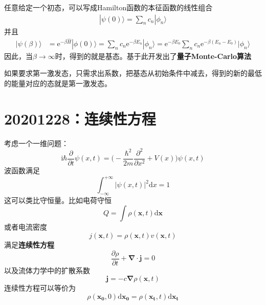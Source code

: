\documentclass[12pt]{article}
\begin{document}
    任意给定一个初态，可以写成Hamilton函数的本征函数的线性组合
    \begin{align*}
        |\psi(0) \rangle = \sum_n c_n |\phi_n\rangle
    \end{align*}
    并且
    \begin{align*}
        |\psi(\beta) \rangle &= \mathrm{e}^{-\beta \hat{H}} |\phi(0) \rangle = \sum_n c_n\mathrm{e}^{-\beta E_n}|\phi_n \rangle = \mathrm{e}^{-\beta E_0} \sum_n c_n \mathrm{e}^{-\beta(E_n-E_0)} |\phi_n \rangle
    \end{align*}
    因此，当$\beta \to \infty$时，得到的就是基态。基于此开发出了\textbf{量子Monte-Carlo算法}

    如果要求第一激发态，只需求出系数，把基态从初始条件中减去，得到的新的最低的能量对应的态就是第一激发态。

\section{20201228：连续性方程}

    考虑一个一维问题：
    \begin{equation*}
        \mathrm{i}\hbar \frac {\partial}{\partial t} \psi(x,t) = \bigg(-\frac {\hbar^2}{2m} \frac {\partial ^2}{\partial x^2} + V(x)\bigg)\psi(x,t)
    \end{equation*}
    波函数满足
    \begin{equation*}
        \int_{-\infty}^{+\infty} |\psi(x,t)|^2 \mathrm{d}x = 1
    \end{equation*}
    这可以类比守恒量。比如电荷守恒
    \begin{equation*}
        Q = \int \rho(\bm{x},t) \mathrm{d}\bm{x}
    \end{equation*}
    或者电流密度
    \begin{equation*}
        j(\bm{x},t) = \rho(\bm{x},t)v(\bm{x},t)
    \end{equation*}
    满足\textbf{连续性方程}
    \begin{equation*}
        \frac{\partial \rho}{\partial t} + \bm{\nabla} \cdot \bm{j} = 0
    \end{equation*}
    以及流体力学中的扩散系数
    \begin{equation*}
        \bm{j} = -c \bm{\nabla}\rho(\bm{x},t)
    \end{equation*}
    连续性方程可以等价为
    \begin{equation*}
        \rho(\bm{x_0},0)\mathrm{d}\bm{x_0} = \rho(\bm{x_t},t)\mathrm{d}\bm{x_t} 
    \end{equation*}
\end{document}
